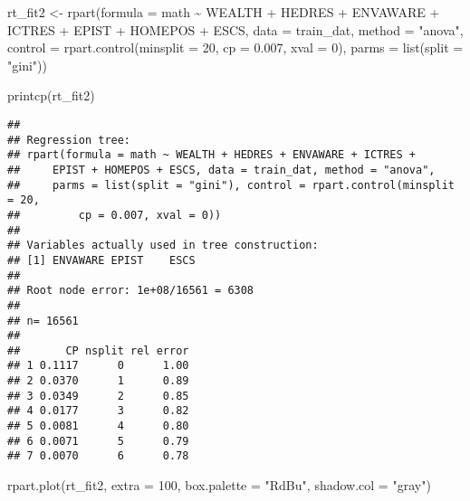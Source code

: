 \documentclass[
]{book}
\newenvironment{Shaded}{\begin{snugshade}}{\end{snugshade}}
\newcommand{\AttributeTok}[1]{\textcolor[rgb]{0.77,0.63,0.00}{#1}}
\newcommand{\DecValTok}[1]{\textcolor[rgb]{0.00,0.00,0.81}{#1}}
\newcommand{\FloatTok}[1]{\textcolor[rgb]{0.00,0.00,0.81}{#1}}
\newcommand{\FunctionTok}[1]{\textcolor[rgb]{0.00,0.00,0.00}{#1}}
\newcommand{\NormalTok}[1]{#1}
\newcommand{\OtherTok}[1]{\textcolor[rgb]{0.56,0.35,0.01}{#1}}
\newcommand{\SpecialCharTok}[1]{\textcolor[rgb]{0.00,0.00,0.00}{#1}}
\newcommand{\StringTok}[1]{\textcolor[rgb]{0.31,0.60,0.02}{#1}}
\begin{document}
\begin{Shaded}
\begin{Highlighting}[]
\NormalTok{rt\_fit2 }\OtherTok{\textless{}{-}} \FunctionTok{rpart}\NormalTok{(}\AttributeTok{formula =}\NormalTok{ math }\SpecialCharTok{\textasciitilde{}}\NormalTok{ WEALTH }\SpecialCharTok{+}\NormalTok{ HEDRES }\SpecialCharTok{+}\NormalTok{ ENVAWARE }\SpecialCharTok{+} 
\NormalTok{                  ICTRES }\SpecialCharTok{+}\NormalTok{ EPIST }\SpecialCharTok{+}\NormalTok{ HOMEPOS }\SpecialCharTok{+}\NormalTok{ ESCS,}
                 \AttributeTok{data =}\NormalTok{ train\_dat,}
                 \AttributeTok{method =} \StringTok{"anova"}\NormalTok{, }
                 \AttributeTok{control =} \FunctionTok{rpart.control}\NormalTok{(}\AttributeTok{minsplit =} \DecValTok{20}\NormalTok{, }
                                         \AttributeTok{cp =} \FloatTok{0.007}\NormalTok{,}
                                         \AttributeTok{xval =} \DecValTok{0}\NormalTok{),}
                \AttributeTok{parms =} \FunctionTok{list}\NormalTok{(}\AttributeTok{split =} \StringTok{"gini"}\NormalTok{))}

\FunctionTok{printcp}\NormalTok{(rt\_fit2)}
\end{Highlighting}
\end{Shaded}

\begin{verbatim}
## 
## Regression tree:
## rpart(formula = math ~ WEALTH + HEDRES + ENVAWARE + ICTRES + 
##     EPIST + HOMEPOS + ESCS, data = train_dat, method = "anova", 
##     parms = list(split = "gini"), control = rpart.control(minsplit = 20, 
##         cp = 0.007, xval = 0))
## 
## Variables actually used in tree construction:
## [1] ENVAWARE EPIST    ESCS    
## 
## Root node error: 1e+08/16561 = 6308
## 
## n= 16561 
## 
##       CP nsplit rel error
## 1 0.1117      0      1.00
## 2 0.0370      1      0.89
## 3 0.0349      2      0.85
## 4 0.0177      3      0.82
## 5 0.0081      4      0.80
## 6 0.0071      5      0.79
## 7 0.0070      6      0.78
\end{verbatim}

\begin{Shaded}
\begin{Highlighting}[]
\FunctionTok{rpart.plot}\NormalTok{(rt\_fit2, }\AttributeTok{extra =} \DecValTok{100}\NormalTok{, }\AttributeTok{box.palette =} \StringTok{"RdBu"}\NormalTok{, }\AttributeTok{shadow.col =} \StringTok{"gray"}\NormalTok{)}
\end{Highlighting}
\end{Shaded}
\end{document}
